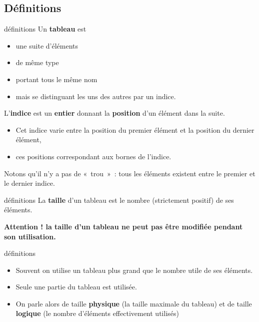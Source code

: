 \subsection{Définitions}

\begin{frame}{définitions}
	Un \textbf{tableau} est 
	\begin{itemize}
		\item	une suite d’éléments 
		\item de même type 
		\item portant tous le même nom 
		\item mais se distinguant les uns des autres par un indice.
	\end{itemize}

	L’\textbf{indice} est un \textbf{entier}
	donnant la \textbf{position} d’un élément dans la suite. 
	
	\begin{itemize}
		\item
		Cet indice varie entre la position du premier élément 
		et la position du dernier élément, 
		\item
		ces positions correspondant aux bornes de l’indice.
	\end{itemize}
	
	Notons qu'il n'y a pas de «~trou~»~: 
	tous les éléments existent entre le premier et le dernier indice.
\end{frame}

\begin{frame}{définitions}
	La \textbf{taille} d’un tableau 
	est le nombre (strictement positif) de ses éléments.
	
	\textbf{
	Attention ! la taille d’un tableau ne peut pas être modifiée pendant
	son utilisation.}
\end{frame}

\begin{frame}{définitions}	
	\begin{itemize}
		\item
		Souvent on utilise un tableau plus grand que
		le nombre utile de ses éléments. 
		\item
		Seule une partie du tableau est utilisée. 
		\item
		On parle alors de taille \textbf{physique}
		(la taille maximale du tableau) 
		et de taille \textbf{logique}
		(le nombre d'éléments effectivement utilisés)
	\end{itemize}
\end{frame}

